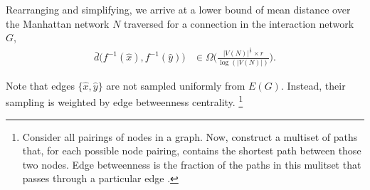 Rearranging and simplifying, we arrive at a lower bound of mean distance over the Manhattan network $N$ traversed for a connection in the interaction network $G$,
\begin{align*}
\bar{d}\Big(f^{-1}(\hat{x}), f^{-1}(\hat{y})\Big)
&\in
\Omega \Big(
  \frac{
    |V(N)|^{\frac{1}{r}} \times r
  }{
    \log(|V(N)|)
  }
\Big).
\end{align*}

Note that edges $\{\hat{x},\hat{y}\}$ are not sampled uniformly from $E(G)$.
Instead, their sampling is weighted by edge betweenness centrality.
\footnote{
Consider all pairings of nodes in a graph.
Now, construct a multiset of paths that, for each possible node pairing, contains the shortest path between those two nodes.
Edge betweenness is the fraction of the paths in this mulitset that passes through a particular edge .
}

